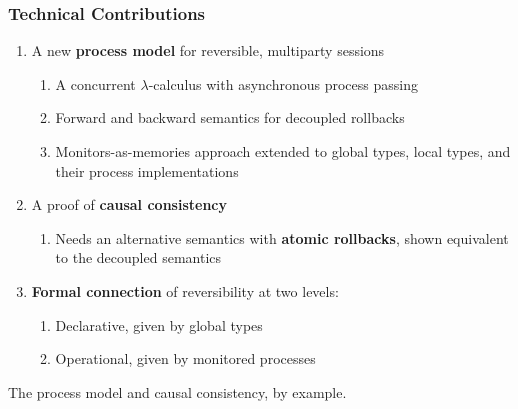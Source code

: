 \documentclass[12pt]{beamer}
\begin{document}
\begin{frame}
\frametitle{Technical Contributions}

	\begin{enumerate}[1.]
	\item A new \textbf{process model} for reversible, multiparty sessions 
	\begin{enumerate}[$\bullet$]
	\item A concurrent $\lambda$-calculus with asynchronous process passing 
	\item Forward and backward  semantics for decoupled rollbacks 
	\item Monitors-as-memories approach extended to global types, local types, and their process implementations
	\end{enumerate}
	\item A proof of \textbf{causal consistency}
		\begin{enumerate}[$\bullet$]
	\item Needs an alternative semantics with \textbf{atomic rollbacks}, shown equivalent to the decoupled semantics
	\end{enumerate}	
	\item \textbf{Formal connection} of reversibility at two levels:
	\begin{enumerate}[$\bullet$]
	\item Declarative, given by global types 
	\item Operational, given by monitored processes
	\end{enumerate}
	\end{enumerate}	
	
	\smallskip
	\pause
	\begin{tcolorbox}[colback=red!10,%
                  colframe=red,%
                  width=12.2cm,%
                  arc=1.5mm, auto outer arc,left=2mm,right=2mm,bottom=1mm,top=1mm,title=\textbf{In this talk}
                 ]
The process model and causal consistency, by example.
\end{tcolorbox}
\end{frame}
\end{document}
